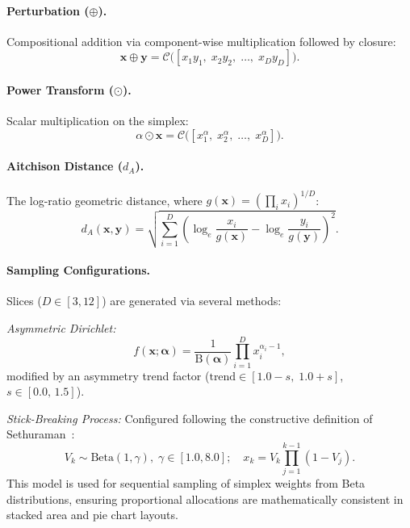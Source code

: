 \documentclass[11pt,twocolumn]{article}
\newcommand{\closure}{\mathcal{C}}
\begin{document}
\paragraph{Perturbation ($\oplus$).} Compositional addition via component-wise multiplication followed by closure:
\begin{equation}\label{eq:perturbation}
  \mathbf{x} \oplus \mathbf{y} = \closure\bigl([x_1 y_1,\; x_2 y_2,\;\ldots,\; x_D y_D]\bigr).
\end{equation}

\paragraph{Power Transform ($\odot$).} Scalar multiplication on the simplex:
\begin{equation}\label{eq:power}
  \alpha \odot \mathbf{x} = \closure\bigl([x_1^\alpha,\; x_2^\alpha,\;\ldots,\; x_D^\alpha]\bigr).
\end{equation}

\paragraph{Aitchison Distance ($d_A$).} The log-ratio geometric distance, where $g(\mathbf{x}) = (\prod_i x_i)^{1/D}$:
\begin{equation}\label{eq:aitchison_dist}
  d_A(\mathbf{x}, \mathbf{y}) = \sqrt{\sum_{i=1}^D \left(\log_e\frac{x_i}{g(\mathbf{x})} - \log_e\frac{y_i}{g(\mathbf{y})}\right)^{\!2}}.
\end{equation}

\paragraph{Sampling Configurations.}
Slices ($D \in [3, 12]$) are generated via several methods:

\noindent\emph{Asymmetric Dirichlet:}
\begin{equation}\label{eq:dirichlet}
  f(\mathbf{x};\bm{\alpha}) = \frac{1}{\mathrm{B}(\bm{\alpha})}\prod_{i=1}^D x_i^{\alpha_i - 1},
\end{equation}
modified by an asymmetry trend factor ($\text{trend} \in [1.0-s,\;1.0+s]$, $s \in [0.0,\,1.5]$).

\noindent\emph{Stick-Breaking Process:} Configured following the constructive definition of Sethuraman~\cite{sethuraman1994constructive}:
\begin{equation}\label{eq:stickbreak}
  V_k \sim \text{Beta}(1, \gamma),\;\gamma \in [1.0,8.0];\quad x_k = V_k\!\prod_{j=1}^{k-1}(1 - V_j).
\end{equation}
This model is used for sequential sampling of simplex weights from Beta distributions, ensuring proportional allocations are mathematically consistent in stacked area and pie chart layouts.
\end{document}

